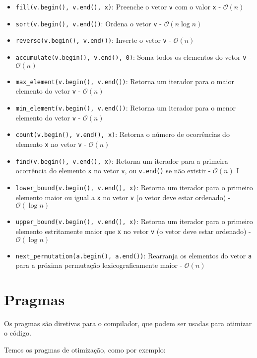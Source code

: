 \documentclass[10pt, a4paper, oneside]{book}
\begin{document}
\begin{itemize}
    \item \texttt{fill(v.begin(), v.end(), x)}: Preenche o vetor \texttt{v} com o valor \texttt{x} - $\mathcal{O}(n)$
    \item \texttt{sort(v.begin(), v.end())}: Ordena o vetor \texttt{v} - $\mathcal{O}(n \log n)$
    \item \texttt{reverse(v.begin(), v.end())}: Inverte o vetor \texttt{v} - $\mathcal{O}(n)$
    \item \texttt{accumulate(v.begin(), v.end(), 0)}: Soma todos os elementos do vetor \texttt{v} - $\mathcal{O}(n)$
    \item \texttt{max\_element(v.begin(), v.end())}: Retorna um iterador para o maior elemento do vetor \texttt{v} - $\mathcal{O}(n)$
    \item \texttt{min\_element(v.begin(), v.end())}: Retorna um iterador para o menor elemento do vetor \texttt{v} - $\mathcal{O}(n)$
    \item \texttt{count(v.begin(), v.end(), x)}: Retorna o número de ocorrências do elemento \texttt{x} no vetor \texttt{v} - $\mathcal{O}(n)$
    \item \texttt{find(v.begin(), v.end(), x)}: Retorna um iterador para a primeira ocorrência do elemento \texttt{x} no vetor \texttt{v}, ou \texttt{v.end()} se não existir - $\mathcal{O}(n)$
    I\item \texttt{lower\_bound(v.begin(), v.end(), x)}: Retorna um iterador para o primeiro elemento maior ou igual a \texttt{x} no vetor \texttt{v} (o vetor deve estar ordenado) - $\mathcal{O}(\log n)$
    \item \texttt{upper\_bound(v.begin(), v.end(), x)}: Retorna um iterador para o primeiro elemento estritamente maior que \texttt{x} no vetor \texttt{v} (o vetor deve estar ordenado) - $\mathcal{O}(\log n)$
    \item \texttt{next\_permutation(a.begin(), a.end())}: Rearranja os elementos do vetor \texttt{a} para a próxima permutação lexicograficamente maior - $\mathcal{O}(n)$
\end{itemize}

\section{Pragmas}

Os pragmas são diretivas para o compilador, que podem ser usadas para otimizar o código.

Temos os pragmas de otimização, como por exemplo:
\end{document}
